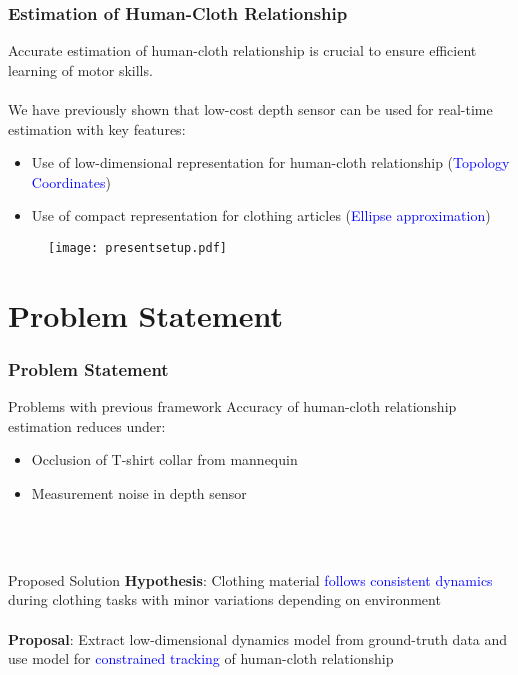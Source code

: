 \documentclass[10pt,handout]{beamer}
\begin{document}
\begin{frame}
\frametitle{Estimation of Human-Cloth Relationship}

Accurate estimation of human-cloth relationship is crucial to ensure efficient learning of motor skills.\\~\\

We have previously shown that low-cost depth sensor can be used for real-time estimation with key features:

\begin{itemize}
  \item Use of low-dimensional representation for human-cloth relationship (\textcolor{blue}{Topology Coordinates})
  \item Use of compact representation for clothing articles (\textcolor{blue}{Ellipse approximation})
\end{itemize}

\begin{figure}
  \centering
  \texttt{[image: presentsetup.pdf]}
\end{figure}

\end{frame}


\section{Problem Statement}

\begin{frame}
\frametitle{Problem Statement}

\begin{alertblock}{Problems with previous framework}
Accuracy of human-cloth relationship estimation reduces under:
\begin{itemize}
  \item Occlusion of T-shirt collar from mannequin
  \item Measurement noise in depth sensor
\end{itemize}
\end{alertblock}

~\\~\\

\begin{block}{Proposed Solution}
\textbf{Hypothesis}: Clothing material \textcolor{blue}{follows consistent dynamics} during clothing tasks with minor variations depending on environment\\~\\

\textbf{Proposal}: Extract low-dimensional dynamics model from ground-truth data and use model for \textcolor{blue}{constrained tracking} of human-cloth relationship
\end{block}

\end{frame}
\end{document}
